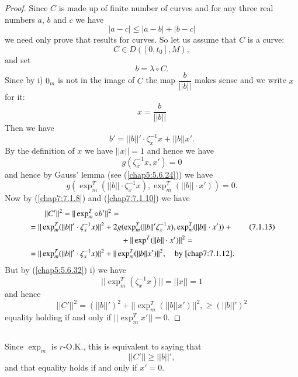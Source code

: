 \begin{proof}
Since $C$ is made up of finite number of curves and for any three real
numbers $a$, $b$ and $c$ we have
$$
|a-c|\leq |a-b|+|b-c|
$$
we need only prove that results for curves. So let us assume that $C$
is a curve:
$$
C\in D([0,t_{0}],M),
$$\pageoriginale
and set
\begin{equation*}
b=\lambda\circ C.\tag{7.1.8}\label{chap7:7.1.8}
\end{equation*}
Since by i) $0_{m}$ is not in the image of $C$ the map
$\dfrac{b}{||b||}$ makes sense and we write $x$ for it:
\begin{equation*}
x=\frac{b}{||b||}\tag{7.1.9}\label{chap7:7.1.9}
\end{equation*}
Then we have
\begin{equation*}
b'=||b||'\cdot \zeta^{-1}_{x}x+||b||x'.\tag{7.1.10}\label{chap7:7.1.10}
\end{equation*}
By the definition of $x$ we have $||x||=1$ and hence we have
$$
g(\zeta^{-1}_{x}x,x')=0
$$
and hence by Gauss' lemma (see (\ref{chap5:5.6.24})) we have
\begin{equation*}
g(\exp^{T}_{m}(||b||\cdot \zeta^{-1}_{x}x), \exp^{T}_{m}(||b||\cdot x'))=0.\tag{7.1.12}\label{chap7:7.1.12}
\end{equation*}
Now by (\ref{chap7:7.1.8}) and (\ref{chap7:7.1.10}) we have
\begin{align*}
&\qquad ||C'||^{2}=||\exp^{T}_{m}\circ b'||^{2}=\\
&  = ||\exp^{T}_{m}(||b||'\cdot\zeta^{-1}_{x}x)
  ||^{2}+2g(\exp^{T}_{m}(||b||'\zeta^{-1}_{x}x),\exp^{T}_{m}(||b||\cdot 
  x'))+ \tag{7.1.13}\label{chap7:7.1.13}\\
&\hspace{4cm} +||\exp^{T}(||b||\cdot x')||^{2}=\\
&= ||\exp^{T}_{m}(||b||'\cdot
  \zeta^{-1}_{x}x)||^{2}+||\exp^{T}_{m}(||b||x')||^{2},\quad\text{by
    \eqref{chap7:7.1.12}.} 
\end{align*}
But by (\ref{chap5:5.6.32}) i) we have
$$
||\exp^{T}_{m}(\zeta^{-1}_{x}x)||=||x||=1
$$
and hence
\begin{equation*}
||C'||^{2}=(||b||')^{2}+||\exp^{T}_{m}(||b||x')||^{2},\geq
(||b||')^{2}\tag{7.1.14}\label{chap7:7.1.14} 
\end{equation*}\pageoriginale
equality holding if and only if $||\exp^{T}_{m}x'||=0$.
\end{proof}

\setcounter{subsection}{14}
\subsection{}\label{chap7:7.1.15}
Since $\exp_{m}$ is $r$-O.K., this is equivalent to saying that
$$
||C'||\geq ||b||',
$$
and that equality holds if and only if $x'=0$.

